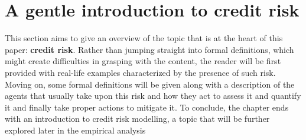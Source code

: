 

\section{A gentle introduction to credit risk}

    This section aims to give an overview of the topic that is at the heart of this paper: \textbf{credit risk}. 
    Rather than jumping straight into formal definitions, which might create difficulties in grasping with the content, 
    the reader will be first provided with real-life examples characterized by the presence of such risk. 
    Moving on, some formal definitions will be given along with a description of the agents that usually take upon 
    this risk and how they act to assess it and quantify it and finally take proper actions to mitigate it. 
    To conclude, the chapter ends with an introduction to credit risk modelling, 
    a topic that will be further explored later in the empirical analysis

            
    
        
